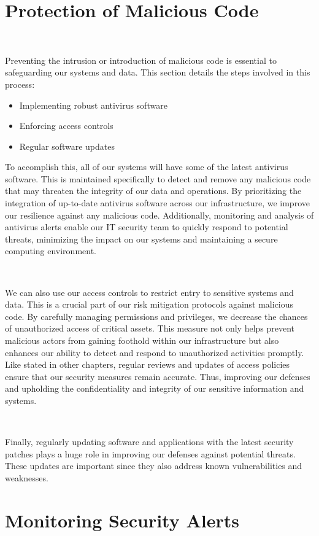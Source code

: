 \documentclass[12pt,a4paper]{report}
\begin{document}
\section{Protection of Malicious Code}
\

Preventing the intrusion or introduction of malicious code is essential to safeguarding our systems and data. 
This section details the steps involved in this process:
\begin{itemize}
 \item Implementing robust antivirus software
 \item Enforcing access controls
 \item Regular software updates
\end{itemize}

To accomplish this, all of our systems will have some of the latest antivirus software.
This is maintained specifically to detect and remove any malicious code that may threaten the integrity of our data and operations.
By prioritizing the integration of up-to-date antivirus software across our infrastructure, we improve our resilience against any malicious code.
Additionally, monitoring and analysis of antivirus alerts enable our IT security team to quickly respond to potential threats, minimizing the impact on our systems and maintaining a secure computing environment.

\

We can also use our access controls to restrict entry to sensitive systems and data.
This is a crucial part of our risk mitigation protocols against malicious code. 
By carefully managing permissions and privileges, we decrease the chances of unauthorized access of critical assets. 
This measure not only helps prevent malicious actors from gaining foothold within our infrastructure but also enhances our ability to detect and respond to unauthorized activities promptly. 
Like stated in other chapters, regular reviews and updates of access policies ensure that our security measures remain accurate. 
Thus, improving our defenses and upholding the confidentiality and integrity of our sensitive information and systems.

\

Finally, regularly updating software and applications with the latest security patches plays a huge role in improving our defenses against potential threats. 
These updates are important since they also address known vulnerabilities and weaknesses.

\section{Monitoring Security Alerts}
\
\end{document}
